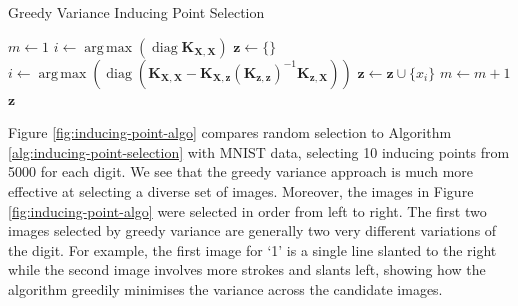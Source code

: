 \documentclass{article}
\newcommand{\diag}{\operatorname{diag}}
\DeclareMathOperator*{\argmax}{arg\,max}
\numberwithin{equation}{section}
\begin{document}
\begin{algorithm}
\caption{Greedy Variance Inducing Point Selection}\label{alg:inducing-point-selection}
\begin{algorithmic}
\State $m \leftarrow 1$
 \State $i \leftarrow \argmax \left(\diag\mathbf{K}_{\mathbf{X}, \mathbf{X}}\right) $
 \State $\mathbf{z} \leftarrow \{\}$ 
\State$i \leftarrow \argmax \left(\diag \left(\mathbf{K}_{\mathbf{X}, \mathbf{X}} - \mathbf{K}_{\mathbf{X}, \mathbf{z}} \left(\mathbf{K}_{\mathbf{z}, \mathbf{z}}\right)^{-1}\mathbf{K}_{\mathbf{z}, \mathbf{X}}\right)\right)$
 \State  $\mathbf{z} \leftarrow \mathbf{z} \cup \{x_i\}$ 
 \State  $m \leftarrow m+1$
\EndWhile
\State \Return $\mathbf{z}$
\end{algorithmic}
\end{algorithm}

Figure \ref{fig:inducing-point-algo} compares random selection to Algorithm \ref{alg:inducing-point-selection} with MNIST data, selecting 10 inducing points from 5000 for each digit. 
We see that the greedy variance approach is much more effective at selecting a diverse set of images.
Moreover, the images in Figure \ref{fig:inducing-point-algo} were selected in order from left to right.
The first two images selected by greedy variance are generally two very different variations of the digit.
For example, the first image for `1' is a single line slanted to the right while the second image involves more strokes and slants left, showing how the algorithm greedily minimises the variance across the candidate images.
\end{document}
